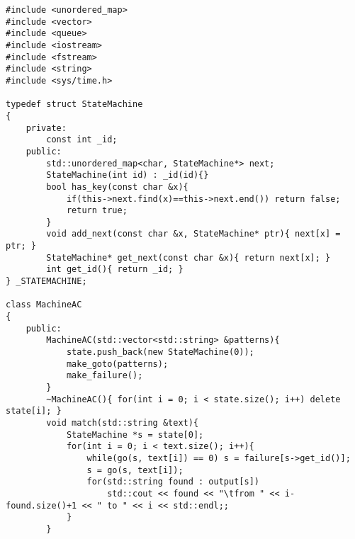 \begin{lstlisting}[caption=Aho-Corasick,label=hoge]
#include <unordered_map>
#include <vector>
#include <queue>
#include <iostream>
#include <fstream>
#include <string>
#include <sys/time.h>

typedef struct StateMachine
{
    private:
        const int _id;
    public:
        std::unordered_map<char, StateMachine*> next;
        StateMachine(int id) : _id(id){}
        bool has_key(const char &x){
            if(this->next.find(x)==this->next.end()) return false;
            return true;
        }
        void add_next(const char &x, StateMachine* ptr){ next[x] = ptr; }
        StateMachine* get_next(const char &x){ return next[x]; }
        int get_id(){ return _id; }
} _STATEMACHINE;

class MachineAC
{
    public:
        MachineAC(std::vector<std::string> &patterns){
            state.push_back(new StateMachine(0));
            make_goto(patterns);
            make_failure();
        }
        ~MachineAC(){ for(int i = 0; i < state.size(); i++) delete state[i]; }
        void match(std::string &text){
            StateMachine *s = state[0];
            for(int i = 0; i < text.size(); i++){
                while(go(s, text[i]) == 0) s = failure[s->get_id()];
                s = go(s, text[i]);
                for(std::string found : output[s])
                    std::cout << found << "\tfrom " << i-found.size()+1 << " to " << i << std::endl;;
            }
        }


\end{lstlisting}
